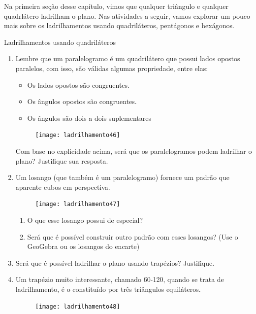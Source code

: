 Na primeira seção desse capítulo, vimos que qualquer triângulo e qualquer quadrlátero ladrilham o plano. Nas atividades a seguir, vamos explorar um pouco mais sobre os ladrilhamentos usando quadriláteros, pentágonos e hexágonos.



\begin{task}{Ladrilhamentos usando quadriláteros}
\begin{enumerate}
	\item Lembre que um paralelogramo é um quadrilátero que possui lados opostos paralelos, com isso, são válidas algumas propriedade, entre elas:
	\begin{itemize}
		\item Os lados opostos são congruentes.
		\item Os ângulos opostos são congruentes.
		\item Os ângulos são dois a dois suplementares
	\end{itemize}
	\begin{figure}[H]
	\centering
	\texttt{[image: ladrilhamento46]}

	\end{figure}

	Com base no explicidade acima, será que os paralelogramos podem ladrilhar o plano? Justifique sua resposta.

	\item Um losango (que também é um paralelogramo) fornece um padrão que aparente cubos em perspectiva.

	\begin{figure}[H]
	\centering
	\texttt{[image: ladrilhamento47]}

	\end{figure}
	\begin{enumerate}
			\item O que esse losango possui de especial?
			\item Será que é possível construir outro padrão com esses losangos? (Use o GeoGebra ou os losangos do encarte)
	\end{enumerate}

	\item Será que é possível ladrilhar o plano usando trapézios? Justifique.


\item Um trapézio muito interessante, chamado 60-120, quando se trata de ladrilhamento, é o constituído por três triângulos equiláteros.

\begin{figure}[H]
\centering
\texttt{[image: ladrilhamento48]}


\end{figure}
\end{enumerate}
\end{task}
